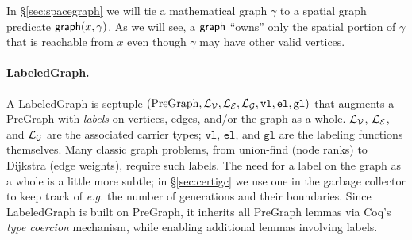 \hide
{In \S\ref{sec:spacegraph} we will tie a mathematical graph $\gamma$ to
a spatial graph predicate
$\mathsf{graph}(x, \gamma)$.   As we will see, a $\mathsf{graph}$ ``owns'' only the
spatial portion of $\gamma$ that is reachable
from $x$ even though $\gamma$ may have other valid vertices.
} %



\vspace{-0.75ex}

\paragraph{LabeledGraph.}
A LabeledGraph is septuple $(\mathrm{PreGraph},\mathcal{L_{V}},\mathcal{L_{E}},\mathcal{L_{G}}, \mathtt{vl},\mathtt{el},\mathtt{gl})$ that augments a PreGraph with \emph{labels} on
vertices, edges, and/or the graph as a whole. $\mathcal{L_{V}}$, $\mathcal{L_{E}}$, and $\mathcal{L_{G}}$
are the associated carrier types; $\mathtt{vl}$, $\mathtt{el}$, and $\mathtt{gl}$
are the labeling functions themselves.
Many classic graph problems, from union-find (node ranks)
to Dijkstra (edge weights), require such labels.
The need for a label on the graph as a whole
is a little more subtle; in \S\ref{sec:certigc} we use one in the garbage collector
to keep track of \emph{e.g.} the number of generations and their boundaries.
Since LabeledGraph is built on PreGraph, it inherits all PreGraph lemmas via
Coq's \emph{type coercion} mechanism, while enabling additional lemmas involving labels.



